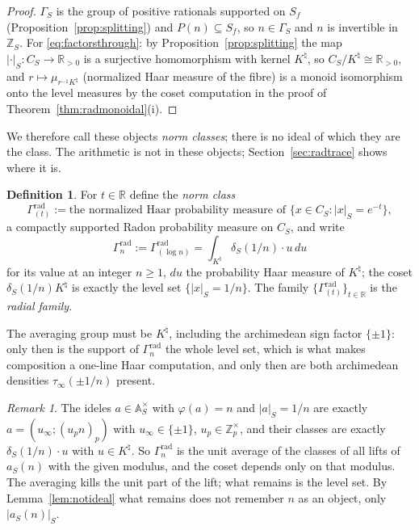 \documentclass[11pt]{amsart}
\theoremstyle{definition}
\newtheorem{definition}[theorem]{Definition}
\theoremstyle{remark}
\newtheorem{remark}[theorem]{Remark}
\newcommand{\R}{\mathbb R}
\newcommand{\Z}{\mathbb Z}
\newcommand{\A}{\mathbb A}
\newcommand{\Knat}{K^{\natural}}
\begin{document}
\begin{proof}
$\Gamma_S$ is the group of positive rationals supported on $S_f$
(Proposition~\ref{prop:splitting}) and $P(n)\subseteq S_f$, so $n\in\Gamma_S$
and $n$ is invertible in $\Z_S$. For \eqref{eq:factorsthrough}: by
Proposition~\ref{prop:splitting} the map $|\cdot|_S:C_S\to\R_{>0}$ is a
surjective homomorphism with kernel $\Knat$, so $C_S/\Knat\cong\R_{>0}$, and
$r\mapsto\mu_{r^{-1}\Knat}$ (normalized Haar measure of the fibre) is a monoid
isomorphism onto the level measures by the coset computation in the proof of
Theorem~\ref{thm:radmonoidal}(i).
\end{proof}

We therefore call these objects \emph{norm classes}; there is no ideal of which
they are the class.  The arithmetic is not in these objects;
Section~\ref{sec:radtrace} shows where it is.

\begin{definition}\label{def:normclass}
For $t\in\R$ define the \emph{norm class}
\begin{equation}\label{eq:normclass}
  \Gamma^{\mathrm{rad}}_{(t)}:=\text{the normalized Haar probability measure
   of }\{x\in C_S:|x|_S=e^{-t}\},
\end{equation}
a compactly supported Radon probability measure on $C_S$, and write
\begin{equation}\label{eq:normclassn}
  \Gamma_n^{\mathrm{rad}}:=\Gamma^{\mathrm{rad}}_{(\log n)}
   =\int_{\Knat}\delta_S(1/n)\cdot u\,du
\end{equation}
for its value at an integer $n\ge1$, $du$ the probability Haar measure of
$\Knat$; the coset $\delta_S(1/n)\Knat$ is exactly the level set
$\{|x|_S=1/n\}$. The family $\{\Gamma^{\mathrm{rad}}_{(t)}\}_{t\in\R}$ is the
\emph{radial family}.
\end{definition}

The averaging group must be $\Knat$, including the archimedean sign factor
$\{\pm1\}$: only then is the support of $\Gamma_n^{\mathrm{rad}}$ the whole
level set, which is what makes composition a one-line Haar computation, and
only then are both archimedean densities $\tau_\infty(\pm1/n)$ present.

\begin{remark}\label{rem:whatthecosetis}
The ideles $a\in\A_S^\times$ with $\varphi(a)=n$ and $|a|_S=1/n$ are exactly
$a=(u_\infty;(u_pn)_p)$ with $u_\infty\in\{\pm1\}$, $u_p\in\Z_p^\times$, and
their classes are exactly $\delta_S(1/n)\cdot u$ with $u\in\Knat$. So
$\Gamma_n^{\mathrm{rad}}$ is the unit average of the classes of all lifts of
$a_S(n)$ with the given modulus, and the coset depends only on that modulus.
The averaging kills the unit part of the lift; what remains is the level set.
By Lemma~\ref{lem:notideal} what remains does not remember $n$ as an object,
only $|a_S(n)|_S$.
\end{remark}
\end{document}
